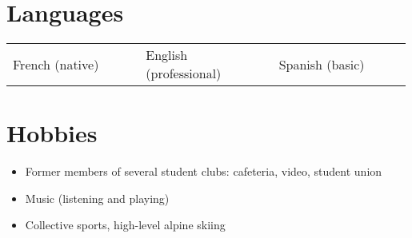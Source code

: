 \documentclass[a4paper,10.5pt]{article}
\begin{document}
	\section*{Languages}
	\begin{tabular}{p{0.33\linewidth}p{0.33\linewidth} p{0.33\linewidth}}		
	French (native) & English (professional) & Spanish (basic) \\
	
	\end{tabular}
	
	\section*{Hobbies}
	\begin{itemize}
		\item Former members of several student clubs: cafeteria, video, student union
		\item Music (listening and playing)
		\item Collective sports, high-level alpine skiing
	\end{itemize}
			
		
	
%	
%

	
\end{document}
